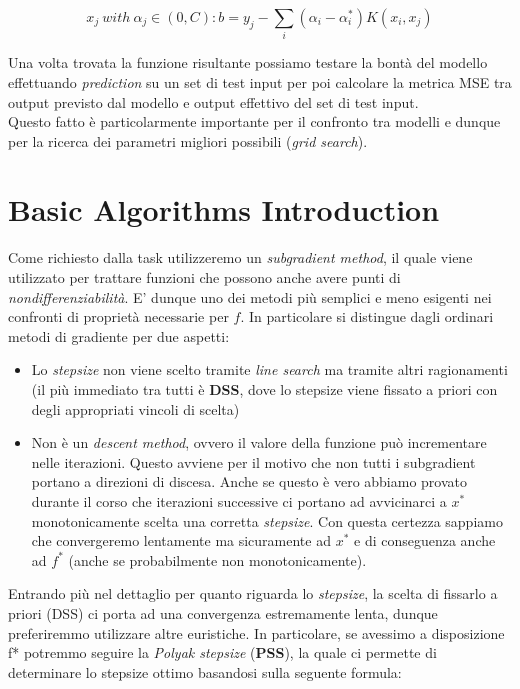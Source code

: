 \documentclass[12pt]{article}
\begin{document}
	\begin{equation}\label{eq:7}
		x_j \  with\  \alpha_j \in(0,C): b = y_j - \sum_i(\alpha_i - \alpha_i^*)K(x_i,x_j)
	\end{equation}

	Una volta trovata la funzione risultante possiamo testare la bontà del modello effettuando \textit{prediction} su un set di test input per poi calcolare la metrica MSE tra output previsto dal modello e output effettivo del set di test input.\\
Questo fatto è particolarmente importante per il confronto tra modelli e dunque per la ricerca dei parametri migliori possibili (\textit{grid search}).

	\section{Basic Algorithms Introduction}
	Come richiesto dalla task utilizzeremo un \textit{subgradient method}, il quale viene utilizzato per trattare funzioni che possono anche avere punti di \textit{nondifferenziabilità}. E’ dunque uno dei metodi più semplici e meno esigenti nei confronti di proprietà necessarie per $f$. In particolare si distingue dagli ordinari metodi di gradiente per due aspetti:
	\begin{itemize}
		\item Lo \textit{stepsize} non viene scelto tramite \textit{line search} ma tramite altri ragionamenti (il più immediato tra tutti è \textbf{DSS}, dove lo stepsize viene fissato a priori con degli appropriati vincoli di scelta)
		\item Non è un \textit{descent method}, ovvero il valore della funzione può incrementare nelle iterazioni. Questo avviene per il motivo che non tutti i subgradient portano a direzioni di discesa. Anche se questo è vero abbiamo provato durante il corso che iterazioni successive ci portano ad avvicinarci a $x^*$ monotonicamente scelta una corretta \textit{stepsize}. Con questa certezza sappiamo che convergeremo lentamente ma sicuramente ad $x^*$ e di conseguenza anche ad $f^*$ (anche se probabilmente non monotonicamente).  
	\end{itemize}
	Entrando più nel dettaglio per quanto riguarda lo \textit{stepsize}, la scelta di fissarlo a priori (DSS) ci porta ad una convergenza estremamente lenta, dunque preferiremmo utilizzare altre euristiche. In particolare, se avessimo a disposizione f* potremmo seguire la \textit{Polyak stepsize} (\textbf{PSS}), la quale ci permette di determinare lo stepsize ottimo basandosi sulla seguente formula:
	
\end{document}
